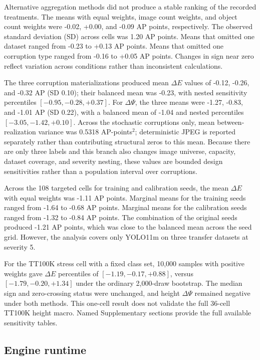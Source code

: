 \documentclass[a4paper,fleqn]{cas-dc}
\begin{document}
Alternative aggregation methods did not produce a stable ranking of the recorded treatments. The means with equal weights, image count weights, and object count weights were -0.02, +0.00, and -0.09 AP points, respectively. The observed standard deviation (SD) across cells was 1.20 AP points. Means that omitted one dataset ranged from -0.23 to +0.13 AP points. Means that omitted one corruption type ranged from -0.16 to +0.05 AP points. Changes in sign near zero reflect variation across conditions rather than inconsistent calculations.

The three corruption materializations produced mean $\Delta E$ values of -0.12, -0.26, and -0.32 AP (SD 0.10); their balanced mean was -0.23, with nested sensitivity percentiles $[-0.95,-0.28,+0.37]$. For $\Delta\Psi$, the three means were -1.27, -0.83, and -1.01 AP (SD 0.22), with a balanced mean of -1.04 and nested percentiles $[-3.05,-1.42,+0.10]$. Across the stochastic corruptions only, mean between-realization variance was 0.5318 AP-points$^2$; deterministic JPEG is reported separately rather than contributing structural zeros to this mean. Because there are only three labels and this branch also changes image universe, capacity, dataset coverage, and severity nesting, these values are bounded design sensitivities rather than a population interval over corruptions.

Across the 108 targeted cells for training and calibration seeds, the mean $\Delta E$ with equal weights was -1.11 AP points. Marginal means for the training seeds ranged from -1.64 to -0.68 AP points. Marginal means for the calibration seeds ranged from -1.32 to -0.84 AP points. The combination of the original seeds produced -1.21 AP points, which was close to the balanced mean across the seed grid. However, the analysis covers only YOLO11m on three transfer datasets at severity 5.

For the TT100K stress cell with a fixed class set, 10,000 samples with positive weights gave $\Delta E$ percentiles of $[-1.19,-0.17,+0.88]$, versus $[-1.79,-0.20,+1.34]$ under the ordinary 2,000-draw bootstrap. The median sign and zero-crossing status were unchanged, and height $\Delta\Psi$ remained negative under both methods. This one-cell result does not validate the full 36-cell TT100K height macro. Named Supplementary sections provide the full available sensitivity tables.

\subsection{Engine runtime}
\label{sec:runtime-results}
\end{document}
